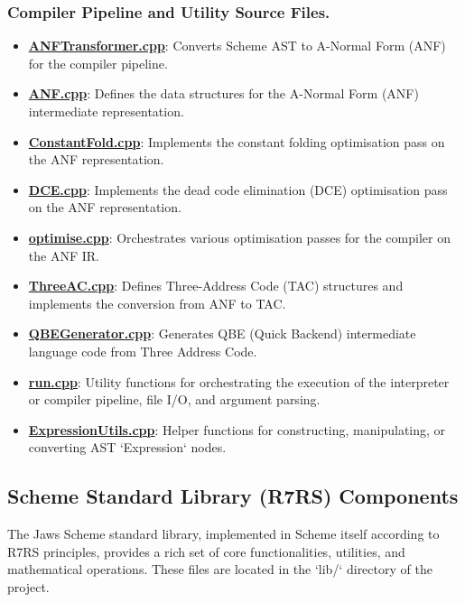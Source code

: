 \documentclass[final]{cmpreport_02}
\begin{document}
\subsubsection*{Compiler Pipeline and Utility Source Files.}
\label{tab:jaws-compiler-utility-files}
\begin{itemize}
    \item \textbf{\href{https://github.com/jamie-wales/Jaws/blob/main/src/compiler/ANFTransformer.cpp}{ANFTransformer.cpp}}: Converts Scheme AST to A-Normal Form (ANF) for the compiler pipeline.
    \item \textbf{\href{https://github.com/jamie-wales/Jaws/blob/main/src/compiler/ANF.cpp}{ANF.cpp}}: Defines the data structures for the A-Normal Form (ANF) intermediate representation.
    \item \textbf{\href{https://github.com/jamie-wales/Jaws/blob/main/src/compiler/ConstantFold.cpp}{ConstantFold.cpp}}: Implements the constant folding optimisation pass on the ANF representation.
    \item \textbf{\href{https://github.com/jamie-wales/Jaws/blob/main/src/compiler/DeadCodeElimination.cpp}{DCE.cpp}}: Implements the dead code elimination (DCE) optimisation pass on the ANF representation.
    \item \textbf{\href{https://github.com/jamie-wales/Jaws/blob/main/src/compiler/optimise.cpp}{optimise.cpp}}: Orchestrates various optimisation passes for the compiler on the ANF IR.
    \item \textbf{\href{https://github.com/jamie-wales/Jaws/blob/main/src/compiler/ThreeAC.cpp}{ThreeAC.cpp}}: Defines Three-Address Code (TAC) structures and implements the conversion from ANF to TAC.
    \item \textbf{\href{https://github.com/jamie-wales/Jaws/blob/main/src/compiler/QBEGenerator.cpp}{QBEGenerator.cpp}}: Generates QBE (Quick Backend) intermediate language code from Three Address Code.
    \item \textbf{\href{https://github.com/jamie-wales/Jaws/blob/main/src/utils/run.cpp}{run.cpp}}: Utility functions for orchestrating the execution of the interpreter or compiler pipeline, file I/O, and argument parsing.
    \item \textbf{\href{https://github.com/jamie-wales/Jaws/blob/main/src/utils/ExpressionUtils.cpp}{ExpressionUtils.cpp}}: Helper functions for constructing, manipulating, or converting AST `Expression` nodes.
\end{itemize}
\subsection{Scheme Standard Library (R7RS) Components}
The Jaws Scheme standard library, implemented in Scheme itself according to R7RS principles, provides a rich set of core functionalities, utilities, and mathematical operations. These files are located in the `lib/` directory of the project.
\end{document}

